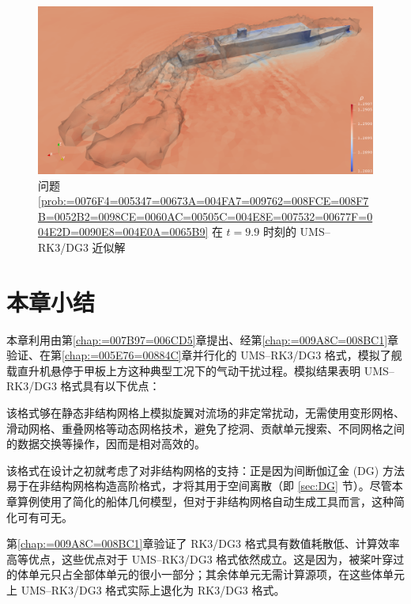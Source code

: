 \begin{figure}[h!]
\begin{centering}
\includegraphics[width=1\textwidth,height=0.28\textheight,keepaspectratio]{figures/ship/a=45_u=10/Frame99}
\par\end{centering}
\caption{\label{fig:ship_u=00003D10_a=00003D45_t=00003D99e-1}问题 \ref{prob:=0076F4=005347=00673A=004FA7=009762=008FCE=008F7B=0052B2=0098CE=0060AC=00505C=004E8E=007532=00677F=004E2D=0090E8=004E0A=0065B9}
在 $t=9.9$ 时刻的 UMS–RK3/DG3 近似解}
\end{figure}


\section{本章小结}

本章利用由第\ref{chap:=007B97=006CD5}章提出、经第\ref{chap:=009A8C=008BC1}章验证、在第\ref{chap:=005E76=00884C}章并行化的
UMS–RK3/DG3 格式，模拟了舰载直升机悬停于甲板上方这种典型工况下的气动干扰过程。模拟结果表明 UMS–RK3/DG3 格式具有以下优点：
\begin{description}[wide]
\item [{能够高效地模拟旋翼对流场的扰动}] 该格式够在静态非结构网格上模拟旋翼对流场的非定常扰动，无需使用变形网格、滑动网格、重叠网格等动态网格技术，避免了挖洞、贡献单元搜索、不同网格之间的数据交换等操作，因而是相对高效的。
\item [{能够处理具有复杂几何外形的船体}] 该格式在设计之初就考虑了对非结构网格的支持：正是因为间断伽辽金 (DG) 方法易于在非结构网格构造高阶格式，才将其用于空间离散（即
\ref{sec:DG} 节）。尽管本章算例使用了简化的船体几何模型，但对于非结构网格自动生成工具而言，这种简化可有可无。
\item [{数值耗散低、计算效率高}] 第\ref{chap:=009A8C=008BC1}章验证了 RK3/DG3 格式具有数值耗散低、计算效率高等优点，这些优点对于
UMS–RK3/DG3 格式依然成立。这是因为，被桨叶穿过的体单元只占全部体单元的很小一部分；其余体单元无需计算源项，在这些体单元上
UMS–RK3/DG3 格式实际上退化为 RK3/DG3 格式。
\end{description}
%

